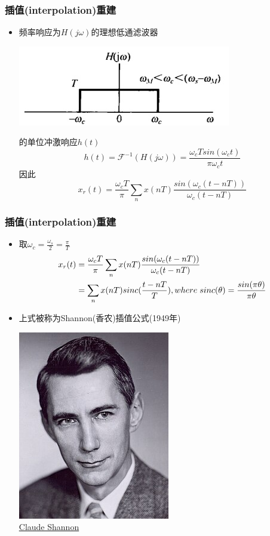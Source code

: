 \documentclass[CJKutf8,xcolor=pdftex,dvipsnames,table]{beamer}
\begin{document}
\begin{CJK*}{UTF8}{song}
  \begin{frame}
    \frametitle{插值(interpolation)重建}
    \begin{itemize}
    \item 频率响应为$H(j\omega)$的理想低通滤波器
	    \begin{center}
    	\includegraphics[scale=.3]{ss-c-f7-4d}
    	\end{center}
 	的单位冲激响应$h(t)$
	\[
		h(t)=\mathscr{F}^{-1}(H(j\omega))=\frac{\omega_c T sin(\omega_c t)}{\pi\omega_c t}
	\]
	因此
	\[
		x_r(t) = \frac{\omega_c T}{\pi} \sum_n x(nT)\frac{sin(\omega_c(t-nT))}{\omega_c (t-nT)}
	\]
    \end{itemize}
  \end{frame}   
  
  \begin{frame}
    \frametitle{插值(interpolation)重建}
    \begin{itemize}
    \item 取$\omega_c=\frac{\omega_s}{2}=\frac{\pi}{T}$
		\begin{align*}
			x_r(t) & = \frac{\omega_c T}{\pi} \sum_n x(nT)\frac{sin(\omega_c(t-nT))}{\omega_c (t-nT)} \\
		       	   & = \sum_n x(nT)sinc(\frac{t-nT}{T}), where \hspace{1mm} sinc(\theta)=\frac{sin(\pi \theta)}{\pi \theta}
		\end{align*}
	\item 上式被称为Shannon(香农)插值公式(1949年)
		\begin{center}
      	\includegraphics[scale=.3]{Claude_Shannon} \\
    	\href{https://en.wikipedia.org/wiki/Claude_Shannon}{Claude Shannon}   	
	\end{center}
    \end{itemize}
  \end{frame}   
  

\end{CJK*}
\end{document}
